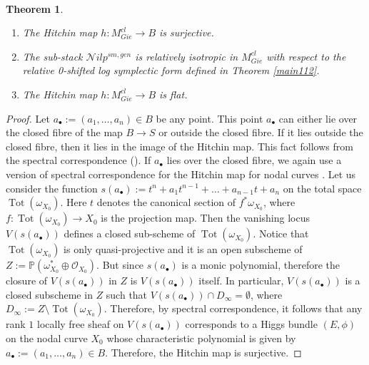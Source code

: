 \documentclass[11pt]{amsart}
\DeclareMathOperator{\Tot}{Tot}
\theoremstyle{plain}
\numberwithin{equation}{section}
\theoremstyle{definition}
\theoremstyle{plain}
\newtheorem{Thm}[Def]{Theorem}
\begin{document}
\


\begin{Thm}\label{isotropic112}
\begin{enumerate}
\item The Hitchin map $h: M^{cl}_{Gie}\longrightarrow B$ is surjective.
\item The sub-stack $\mathcal Nilp^{sm, gen}$ is relatively isotropic in $M^{cl}_{Gie}$ with respect to the relative 0-shifted log symplectic form defined in Theorem \ref{main112}.
\item The Hitchin map $h: M^{cl}_{Gie}\longrightarrow B$ is flat.
\end{enumerate}
\end{Thm}


\begin{proof}


 Let $a_{\bullet}:=(a_1,\dots, a_n)\in B$ be any point. This point $a_{\bullet}$ can either lie over the closed fibre of the map $B\to S$ or outside the closed fibre. If it lies outside the closed fibre, then it lies in the image of the Hitchin map. This fact follows from the spectral correspondence (\cite[Theorem 6.11]{32.1}). If $a_{\bullet}$ lies over the closed fibre, we again use a version of spectral correspondence for the Hitchin map for nodal curves \cite[Lemma 2.4]{2a}. Let us consider the function $s(a_{\bullet}):=t^n+a_1t^{n-1}+\dots+a_{n-1}t+a_n$ on the total space $\Tot(\omega_{X_0})$. Here $t$ denotes the canonical section of $f^*\omega_{X_0}$, where $f: \Tot(\omega_{X_0})\longrightarrow X_0$ is the projection map. Then the vanishing locus $V(s(a_{\bullet}))$ defines a closed sub-scheme of $\Tot(\omega_{X_0})$. Notice that $\Tot(\omega_{X_0})$ is only quasi-projective and it is an open subscheme of $Z:=\mathbb P(\omega_{X_0}^*\oplus \mathcal O_{X_0})$. But since $s(a_{\bullet})$ is a monic polynomial, therefore the closure of $V(s(a_{\bullet}))$ in $Z$ is $V(s(a_{\bullet}))$ itself. In particular, $V(s(a_{\bullet}))$ is a closed subscheme in $Z$ such that $V(s(a_{\bullet}))\cap D_{\infty}=\emptyset$, where $D_{\infty}:=Z\setminus \Tot(\omega_{X_0})$. Therefore, by spectral correspondence, it follows that any rank $1$ locally free sheaf on $V(s(a_{\bullet}))$ corresponds to a Higgs bundle $(E, \phi)$ on the nodal curve $X_0$ whose characteristic polynomial is given by $a_{\bullet}:=(a_1,\dots, a_n)\in B$. Therefore, the Hitchin map is surjective.

\vspace{1em}


\end{proof}
\end{document}
